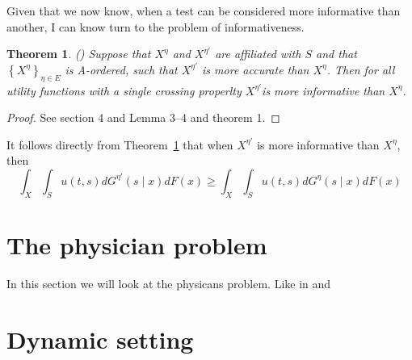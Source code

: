 \documentclass[10pt,a4paper]{article} %
\newtheorem{thm}{Theorem}[section]
\theoremstyle{definition}
\theoremstyle{remark}
\begin{document}
Given that we now know, when a test can be considered more informative
than another, I can know turn to the problem of informativeness.

\begin{thm}\label{thm:informative}
(\citet{Persico2000}) Suppose that $X^{\eta}$ and $X^{\eta'}$ are affiliated with $S$ and that $\left\{ X^{\eta}\right\} _{\eta\in E}$ is A-ordered, such that $X^{\eta'}$ is more accurate than $X^{\eta}$. Then for all utility functions with a single crossing properlty $X^{\eta'}$is more informative than $X^{\eta}$.
\end{thm}

\begin{proof}
See \citet{Lehmann1988} section 4 and \citet{Karlin1956} Lemma
3--4 and theorem 1.
\end{proof}

It follows directly from Theorem~\ref{thm:informative} that when
$X^{\eta'}$ is more informative than $X^{\eta}$, then
\[
\int_{X}\int_{S}u(t,s)dG^{\eta'}(s\mid x)dF(x)\ge\int_{X}\int_{S}u(t,s)dG^{\eta}(s\mid x)dF(x)
\]


\section{The physician problem}
In this section we will look at the physicans problem. Like in \citet{Allard2009} and \citet{Weiss1996}
\section{Dynamic setting}



\end{document}

